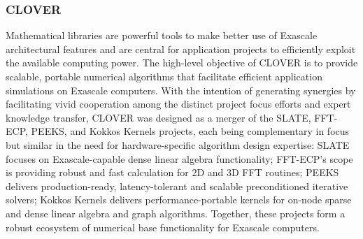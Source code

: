 \subsubsection{ CLOVER} 
Mathematical libraries are powerful tools to make better use of Exascale 
architectural features and are central for application projects to efficiently 
exploit the available computing power. The high-level objective of CLOVER is to 
provide scalable, portable numerical algorithms that facilitate efficient 
application simulations on Exascale computers. With the intention of generating synergies 
by facilitating vivid cooperation among the distinct project focus efforts 
and expert knowledge transfer, CLOVER was designed as a merger of the SLATE, 
FFT-ECP, PEEKS, and Kokkos Kernels projects, each being complementary 
in focus but similar in the need for hardware-specific algorithm design 
expertise: SLATE focuses on Exascale-capable dense linear algebra 
functionality; FFT-ECP’s scope is providing robust and fast calculation for 2D 
and 3D FFT routines; PEEKS delivers production-ready, latency-tolerant and 
scalable preconditioned iterative solvers; Kokkos Kernels delivers
performance-portable kernels for on-node sparse and dense linear algebra and 
graph algorithms. Together, these projects form a robust ecosystem of numerical 
base functionality for Exascale computers.
\newpage
